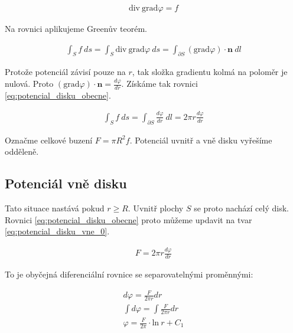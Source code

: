 \documentclass{book}
\newcommand{\vect}[1]{\boldsymbol{#1}}
\newcommand{\grad}{\mathrm{grad}}
\newcommand{\diverg}{\mathrm{div}}
\begin{document}
\begin{equation}
\begin{split}
\diverg \ \grad \varphi = f
\end{split}
\end{equation}

Na rovnici aplikujeme Greenův teorém.

\begin{equation}
\begin{split}
\int_S f \ ds = \int_S \diverg \ \grad \varphi \ ds = \int_{\partial S} (\grad \varphi) \cdot \vect{n} \ dl
\end{split}
\end{equation}

Protože potenciál závisí pouze na \(r\), tak složka gradientu kolmá na poloměr je nulová. Proto \((\grad \varphi) \cdot \vect{n} = \frac{d \varphi}{dr}\).
Získáme tak rovnici \eqref{eq:potencial_disku_obecne}.

\begin{equation}
\label{eq:potencial_disku_obecne}
\begin{split}
\int_S f \ ds = \int_{\partial S} \frac{d \varphi}{dr} \ dl = 2 \pi r \frac{d \varphi}{dr}
\end{split}
\end{equation}

Označme celkové buzení \(F = \pi R^2 f\).
Potenciál uvnitř a vně disku vyřešíme odděleně.

\subsection{Potenciál vně disku}

Tato situace nastává pokud \(r \geq R\). Uvnitř plochy \(S\) se proto nachází celý disk. Rovnici \eqref{eq:potencial_disku_obecne} proto můžeme updavit na tvar \eqref{eq:potencial_disku_vne_0}.

\begin{equation}
\label{eq:potencial_disku_vne_0}
\begin{split}
F = 2 \pi r \frac{d \varphi}{dr}
\end{split}
\end{equation}

To je obyčejná diferenciální rovnice se separovatelnými proměnnými:

\begin{equation}
\label{eq:potencial_disku_vne_1}
\begin{split}
d \varphi = \frac{F}{2 \pi r} dr \\
\int d \varphi = \int \frac{F}{2 \pi r} dr \\
\varphi = \frac{F}{2 \pi} \cdot \mathrm{ln} \ r + C_1 \\
\end{split}
\end{equation}
\end{document}
